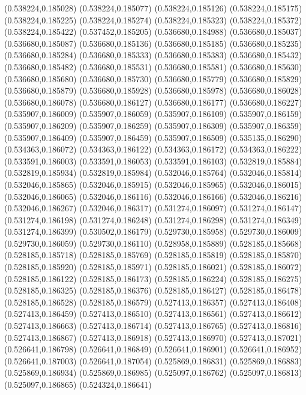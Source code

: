 (0.538224,0.185028)
(0.538224,0.185077)
(0.538224,0.185126)
(0.538224,0.185175)
(0.538224,0.185225)
(0.538224,0.185274)
(0.538224,0.185323)
(0.538224,0.185372)
(0.538224,0.185422)
(0.537452,0.185205)
(0.536680,0.184988)
(0.536680,0.185037)
(0.536680,0.185087)
(0.536680,0.185136)
(0.536680,0.185185)
(0.536680,0.185235)
(0.536680,0.185284)
(0.536680,0.185333)
(0.536680,0.185383)
(0.536680,0.185432)
(0.536680,0.185482)
(0.536680,0.185531)
(0.536680,0.185581)
(0.536680,0.185630)
(0.536680,0.185680)
(0.536680,0.185730)
(0.536680,0.185779)
(0.536680,0.185829)
(0.536680,0.185879)
(0.536680,0.185928)
(0.536680,0.185978)
(0.536680,0.186028)
(0.536680,0.186078)
(0.536680,0.186127)
(0.536680,0.186177)
(0.536680,0.186227)
(0.535907,0.186009)
(0.535907,0.186059)
(0.535907,0.186109)
(0.535907,0.186159)
(0.535907,0.186209)
(0.535907,0.186259)
(0.535907,0.186309)
(0.535907,0.186359)
(0.535907,0.186409)
(0.535907,0.186459)
(0.535907,0.186509)
(0.535135,0.186290)
(0.534363,0.186072)
(0.534363,0.186122)
(0.534363,0.186172)
(0.534363,0.186222)
(0.533591,0.186003)
(0.533591,0.186053)
(0.533591,0.186103)
(0.532819,0.185884)
(0.532819,0.185934)
(0.532819,0.185984)
(0.532046,0.185764)
(0.532046,0.185814)
(0.532046,0.185865)
(0.532046,0.185915)
(0.532046,0.185965)
(0.532046,0.186015)
(0.532046,0.186065)
(0.532046,0.186116)
(0.532046,0.186166)
(0.532046,0.186216)
(0.532046,0.186267)
(0.532046,0.186317)
(0.531274,0.186097)
(0.531274,0.186147)
(0.531274,0.186198)
(0.531274,0.186248)
(0.531274,0.186298)
(0.531274,0.186349)
(0.531274,0.186399)
(0.530502,0.186179)
(0.529730,0.185958)
(0.529730,0.186009)
(0.529730,0.186059)
(0.529730,0.186110)
(0.528958,0.185889)
(0.528185,0.185668)
(0.528185,0.185718)
(0.528185,0.185769)
(0.528185,0.185819)
(0.528185,0.185870)
(0.528185,0.185920)
(0.528185,0.185971)
(0.528185,0.186021)
(0.528185,0.186072)
(0.528185,0.186122)
(0.528185,0.186173)
(0.528185,0.186224)
(0.528185,0.186275)
(0.528185,0.186325)
(0.528185,0.186376)
(0.528185,0.186427)
(0.528185,0.186478)
(0.528185,0.186528)
(0.528185,0.186579)
(0.527413,0.186357)
(0.527413,0.186408)
(0.527413,0.186459)
(0.527413,0.186510)
(0.527413,0.186561)
(0.527413,0.186612)
(0.527413,0.186663)
(0.527413,0.186714)
(0.527413,0.186765)
(0.527413,0.186816)
(0.527413,0.186867)
(0.527413,0.186918)
(0.527413,0.186970)
(0.527413,0.187021)
(0.526641,0.186798)
(0.526641,0.186849)
(0.526641,0.186901)
(0.526641,0.186952)
(0.526641,0.187003)
(0.526641,0.187054)
(0.525869,0.186831)
(0.525869,0.186883)
(0.525869,0.186934)
(0.525869,0.186985)
(0.525097,0.186762)
(0.525097,0.186813)
(0.525097,0.186865)
(0.524324,0.186641)
